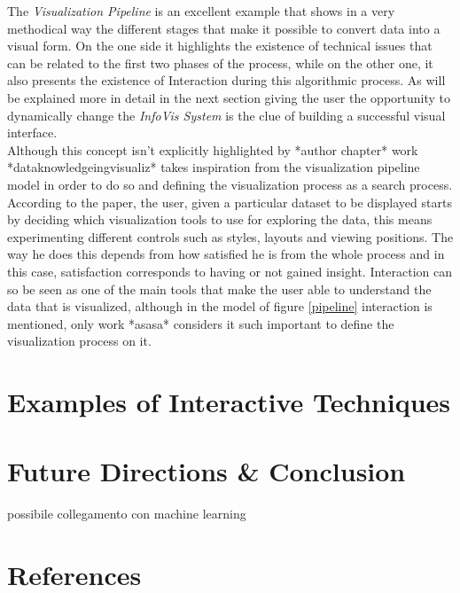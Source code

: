 \documentclass[10p,letterpaper]{article}
\begin{document}
The \textit{Visualization Pipeline} is an excellent example that shows in a very methodical way the different stages that make it possible to convert data into a visual form. On the one side it highlights the existence of technical issues that can be related to the first two phases of the process, while on the other one, it also presents the existence of Interaction during this algorithmic process. As will be explained more in detail in the next section giving the user the opportunity to dynamically change the \textit{InfoVis System} is the clue of building a successful visual interface.\\
Although this concept isn't explicitly highlighted by *author chapter* work *dataknowledgeingvisualiz* takes inspiration from the visualization pipeline model in order to do so and defining the visualization process as a search process. According to the paper, the user, given a particular dataset to be displayed starts by deciding which visualization tools to use for exploring the data, this means experimenting different controls such as styles, layouts and viewing positions. The way he does this depends from how satisfied he is from the whole process and in this case, satisfaction corresponds to having or not gained insight. Interaction can so be seen as one of the main tools that make the user able to understand the data that is visualized, although in the model of figure \ref{pipeline} interaction is mentioned, only work *asasa* considers it such important to define the visualization process on it. 


\section{Examples of Interactive Techniques}

\section{Future Directions \& Conclusion}
possibile collegamento con machine learning

\section{References}

\nocite{ChalnickBillman1988a}




\setlength{\bibleftmargin}{.125in}
\setlength{\bibindent}{-\bibleftmargin}


\end{document}
